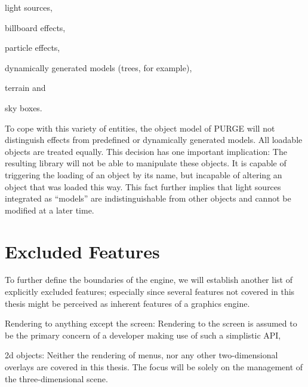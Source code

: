 		\begin{smalllist}
			\item light sources,
			\item billboard effects,
			\item particle effects,
			\item dynamically generated models (trees, for example),
			\item terrain and
			\item sky boxes.
		\end{smalllist}

		To cope with this variety of entities, the object model of PURGE will not distinguish effects from predefined or dynamically generated models. All loadable objects are treated equally. This decision has one important implication: The resulting library will not be able to manipulate these objects. It is capable of triggering the loading of an object by its name, but incapable of altering an object that was loaded this way. This fact further implies that light sources integrated as ``models'' are indistinguishable from other objects and cannot be modified at a later time.

\section{Excluded Features}

	To further define the boundaries of the engine, we will establish another list of explicitly excluded features; especially since several features not covered in this thesis might be perceived as inherent features of a graphics engine.

	\begin{smalllist}
		\item Rendering to anything except the screen: Rendering to the screen is assumed to be the primary concern of a developer making use of such a simplistic API,
		\item 2d objects: Neither the rendering of menus, nor any other two-dimensional overlays are covered in this thesis. The focus will be solely on the management of the three-dimensional scene.
	\end{smalllist}

